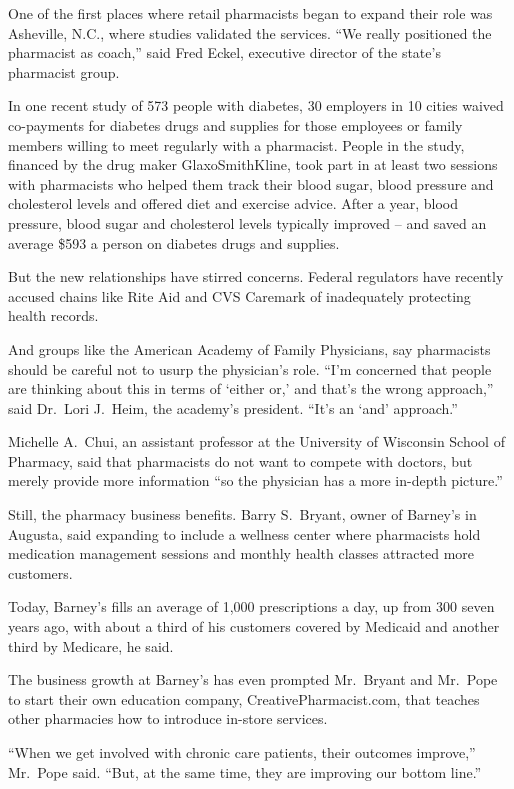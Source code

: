 ﻿\documentclass[12pt]{article}
\begin{document}
One of the first places where retail pharmacists began to expand their role was Asheville, N.C.,
where studies validated the services. ``We really positioned the pharmacist as coach,'' said Fred
Eckel, executive director of the state's pharmacist group.

In one recent study of 573 people with diabetes, 30 employers in 10 cities waived co-payments for
diabetes drugs and supplies for those employees or family members willing to meet regularly with a
pharmacist. People in the study, financed by the drug maker GlaxoSmithKline, took part in at least
two sessions with pharmacists who helped them track their blood sugar, blood pressure and
cholesterol levels and offered diet and exercise advice. After a year, blood pressure, blood sugar
and cholesterol levels typically improved -- and saved an average \$593 a person on diabetes drugs
and supplies.

But the new relationships have stirred concerns. Federal regulators have recently accused chains
like Rite Aid and CVS Caremark of inadequately protecting health records.

And groups like the American Academy of Family Physicians, say pharmacists should be careful not to
usurp the physician's role. ``I'm concerned that people are thinking about this in terms of `either
or,' and that's the wrong approach,'' said Dr.~Lori J.~Heim, the academy's president. ``It's an
`and' approach.''

Michelle A.~Chui, an assistant professor at the University of Wisconsin School of Pharmacy, said
that pharmacists do not want to compete with doctors, but merely provide more information ``so the
physician has a more in-depth picture.''

Still, the pharmacy business benefits. Barry S.~Bryant, owner of Barney's in Augusta, said expanding
to include a wellness center where pharmacists hold medication management sessions and monthly
health classes attracted more customers.

Today, Barney's fills an average of 1,000 prescriptions a day, up from 300 seven years ago, with
about a third of his customers covered by Medicaid and another third by Medicare, he said.

The business growth at Barney's has even prompted Mr.~Bryant and Mr.~Pope to start their own
education company, CreativePharmacist.com, that teaches other pharmacies how to introduce in-store
services.

``When we get involved with chronic care patients, their outcomes improve,'' Mr.~Pope said. ``But,
at the same time, they are improving our bottom line.''
\end{document}
